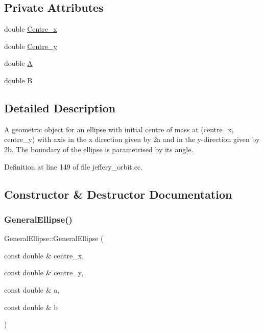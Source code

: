\subsection*{Private Attributes}
\begin{DoxyCompactItemize}
\item 
double \hyperlink{classGeneralEllipse_aeb974769f58d136a12ac1532506304cc}{Centre\+\_\+x}
\item 
double \hyperlink{classGeneralEllipse_abf2def5a5140bb35e381b800c4b91dc9}{Centre\+\_\+y}
\item 
double \hyperlink{classGeneralEllipse_ae583e1437da6ad4eb228dda60b61808a}{A}
\item 
double \hyperlink{classGeneralEllipse_a185ae9786d5c6c82eef61e163e9310c6}{B}
\end{DoxyCompactItemize}


\subsection{Detailed Description}
A geometric object for an ellipse with initial centre of mass at (centre\+\_\+x, centre\+\_\+y) with axis in the x direction given by 2a and in the y-\/direction given by 2b. The boundary of the ellipse is parametrised by its angle. 

Definition at line 149 of file jeffery\+\_\+orbit.\+cc.



\subsection{Constructor \& Destructor Documentation}
\mbox{\label{classGeneralEllipse_a50dc036d709bcd1d53eafb62b5548f67}} 
\subsubsection{\texorpdfstring{General\+Ellipse()}{GeneralEllipse()}}
{\footnotesize\ttfamily General\+Ellipse\+::\+General\+Ellipse (\begin{DoxyParamCaption}\item[{const double \&}]{centre\+\_\+x,  }\item[{const double \&}]{centre\+\_\+y,  }\item[{const double \&}]{a,  }\item[{const double \&}]{b }\end{DoxyParamCaption})\hspace{0.3cm}{\ttfamily [inline]}}



